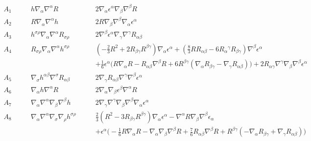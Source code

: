 \documentclass[10pt,letterpaper]{article}
\numberwithin{equation}{section}
\begin{document}
\begin{eqnarray}
A_{1}{}\qquad&
h \nabla_{\alpha }\nabla^{\alpha }R\qquad&
2 \nabla_{\alpha }\epsilon^{\alpha } \nabla_{\beta }\nabla^{\beta }R
\nonumber\\
A_{2}{}\qquad&
R \nabla_{\alpha }\nabla^{\alpha }h\qquad&
2 R \nabla_{\beta }\nabla^{\beta }\nabla_{\alpha }\epsilon^{\alpha }
\nonumber\\
A_{3}{}\qquad&
h^{\sigma \rho } \nabla_{\alpha }\nabla^{\alpha }R_{\sigma \rho }\qquad&
2 \nabla^{\beta }\epsilon^{\alpha } \nabla_{\gamma }\nabla^{\gamma }R_{\alpha \beta }
\nonumber\\
A_{4}{}\qquad&
R_{\sigma \rho } \nabla_{\alpha }\nabla^{\alpha }h^{\sigma \rho }\qquad&
(- \tfrac{2}{3} R^2 + 2 R_{\beta \gamma } R^{\beta \gamma }) \nabla_{\alpha }\epsilon^{\alpha } + (\tfrac{8}{3} R R_{\alpha \beta } - 6 R_{\alpha }{}^{\gamma } R_{\beta \gamma }) \nabla^{\beta }\epsilon^{\alpha }
\nonumber\\
\qquad& &
 + \tfrac{1}{6} \epsilon^{\alpha } \bigl(R \nabla_{\alpha }R -  R_{\alpha \beta } \nabla^{\beta }R + 6 R^{\beta \gamma } (\nabla_{\alpha }R_{\beta \gamma } -  \nabla_{\gamma }R_{\alpha \beta })\bigr) + 2 R_{\alpha \gamma } \nabla^{\gamma }\nabla_{\beta }\nabla^{\beta }\epsilon^{\alpha }
\nonumber\\
A_{5}{}\qquad&
\nabla_{\sigma }h^{\alpha \beta } \nabla^{\sigma }R_{\alpha \beta }\qquad&
2 \nabla_{\gamma }R_{\alpha \beta } \nabla^{\gamma }\nabla^{\beta }\epsilon^{\alpha }
\nonumber\\
A_{6}{}\qquad&
\nabla_{\alpha }h \nabla^{\alpha }R\qquad&
2 \nabla_{\alpha }\nabla_{\beta }\epsilon^{\beta } \nabla^{\alpha }R
\nonumber\\
A_{7}{}\qquad&
\nabla_{\alpha }\nabla^{\alpha }\nabla_{\beta }\nabla^{\beta }h\qquad&
2 \nabla_{\gamma }\nabla^{\gamma }\nabla_{\beta }\nabla^{\beta }\nabla_{\alpha }\epsilon^{\alpha }
\nonumber\\
A_{8}{}\qquad&
\nabla_{\alpha }\nabla^{\alpha }\nabla_{\sigma }\nabla_{\rho }h^{\sigma \rho }\qquad&
\tfrac{2}{3} (R^2 - 3 R_{\beta \gamma } R^{\beta \gamma }) \nabla_{\alpha }\epsilon^{\alpha } -  \nabla^{\alpha }R \nabla_{\beta }\nabla^{\beta }\epsilon_{\alpha }
\nonumber\\
\qquad & &
 + \epsilon^{\alpha } \bigl(- \tfrac{1}{6} R \nabla_{\alpha }R -  \nabla_{\alpha }\nabla_{\beta }\nabla^{\beta }R + \tfrac{7}{6} R_{\alpha \beta } \nabla^{\beta }R + R^{\beta \gamma } (- \nabla_{\alpha }R_{\beta \gamma } + \nabla_{\gamma }R_{\alpha \beta })\bigr)
\nonumber\\

\end{eqnarray}
\end{document}
